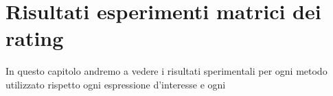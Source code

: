 \hypertarget{(chap:capitolo6)}{}
\chapter{Risultati esperimenti matrici dei rating}
In questo capitolo andremo a vedere i risultati sperimentali per ogni metodo utilizzato rispetto ogni espressione d'interesse e ogni 